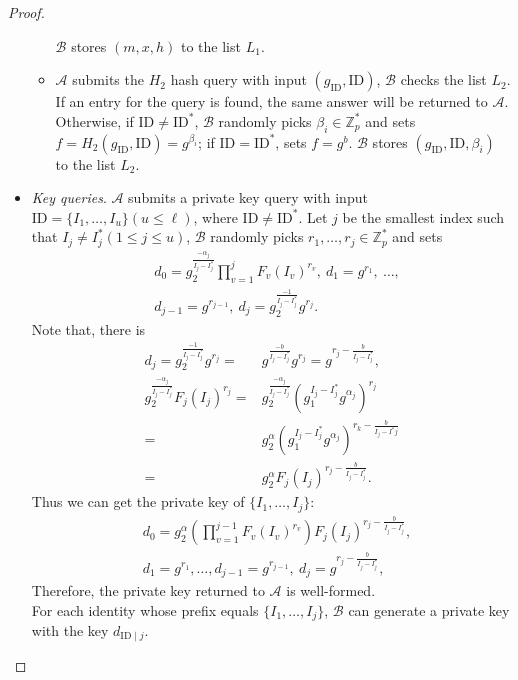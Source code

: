 \documentclass[times]{secauth}
\theoremstyle{definition}
\theoremstyle{remark}
\begin{document}
\begin{proof}
\begin{itemize}
\begin{itemize}
	$\mathcal{B}$ stores $(m, x, h)$ to the list $L_1$.
	\item $\mathcal{A}$ submits the $H_2$ hash query with input $(g_\mathrm{ID}, \mathrm{ID})$, $\mathcal{B}$ checks the list $L_2$. 
		If an entry for the query is found, the same answer will be returned to $\mathcal{A}$. 
		Otherwise, if $\mathrm{ID} \neq \mathrm{ID}^*$, $\mathcal{B}$ randomly picks $\beta_i \in \mathbb{Z}_p^*$ and sets $f = H_2(g_\mathrm{ID}, \mathrm{ID}) = g^{\beta_i}$; if $\mathrm{ID} = \mathrm{ID}^*$, sets $f = g^b$.
		$\mathcal{B}$ stores $(g_\mathrm{ID}, \mathrm{ID}, \beta_i)$ to the list $L_2$.
	\end{itemize}
	\item \emph{Key queries}. 
	$\mathcal{A}$ submits a private key query with input $\mathrm{ID} = \{I_1, \ldots, I_u\} (u \leqslant \ell)$, where $\mathrm{ID} \neq \mathrm{ID}^*$.
	Let $j$ be the smallest index such that $I_j \neq I^*_j (1 \leqslant j \leqslant u)$, $\mathcal{B}$ randomly picks $r_1, \ldots, r_j \in \mathbb{Z}_p^*$ and sets
	\begin{align*}
	&d_0 = g_2^{\frac{-\alpha_j}{I_j-I^*_j}}\prod_{v=1}^{j}F_v(I_v)^{r_v}, ~d_1=g^{r_1}, ~\ldots, \\
	&d_{j-1}=g^{r_{j-1}}, ~d_j=g_2^{\frac{-1}{I_j-I^*_j}}g^{r_j}.
	\end{align*}
	Note that, there is
	\begin{align*}
	d_j = g_2^{\frac{-1}{I_j-I^*_j}}g^{r_j} = &g^{\frac{-b}{I_j-I^*_j}}g^{r_j} = g^{r_j-\frac{b}{I_j-I^*_j}},\\
	g_2^{\frac{-\alpha_j}{I_j-I^*_j}}F_j(I_j)^{r_j} = &g_2^{\frac{-\alpha_j}{I_j-I^*_j}}(g_1^{I_j-I^*_j}g^{\alpha_j})^{r_j}\\ 
	= &g_2^\alpha(g_1^{I_j-I^*_j}g^{\alpha_j})^{r_k-\frac{b}{I_j-I^*j}} \\
	= &g_2^\alpha F_j(I_j)^{r_j-\frac{b}{I_j-I^*_j}}.
	\end{align*}
	Thus we can get the private key of $\{I_1, \ldots, I_j\}$:
	\begin{align*}
	&d_0 = g_2^\alpha \left(\prod_{v=1}^{j-1}F_v(I_v)^{r_v}\right)F_j(I_j)^{r_j-\frac{b}{I_j-I^*_j}},\\ 
	&d_1=g^{r_1}, \ldots, d_{j-1}=g^{r_{j-1}}, ~d_j=g^{r_j-\frac{b}{I_j-I^*_j}},
	\end{align*}
	Therefore, the private key returned to $\mathcal{A}$ is well-formed.\\
	For each identity whose prefix equals $\{I_1, \ldots, I_j\}$, $\mathcal{B}$ can generate a private key with the key $d_{\mathrm{ID}\mid j}$.

\end{itemize}
\end{proof}
\end{document}
